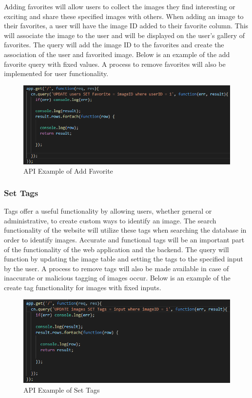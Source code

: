 \documentclass[12pt]{report}
\begin{document}
\begin{enumerate}
Adding favorites will allow users to collect the images they find interesting or exciting and share these specified images with others.  When adding an image to their favorites, a user will have the image ID added to their favorite column.  This will associate the image to the user and will be displayed on the user’s gallery of favorites.  The query will add the image ID to the favorites and create the association of the user and favorited image.  Below is an example of the add favorite query with fixed values.  A process to remove favorites will also be implemented for user functionality.

\begin{figure}[h]
	\centering
	\includegraphics[scale=0.5]{api_add_favorite}
	\caption{API Example of Add Favorite}
	\label{fig:API Add Favorite}
\end{figure}

\subsubsection*{Set Tags}

Tags offer a useful functionality by allowing users, whether general or administrative, to create custom ways to identify an image.  The search functionality of the website will utilize these tags when searching the database in order to identify images.  Accurate and functional tags will be an important part of the functionality of the web application and the backend.  The query will function by updating the image table and setting the tags to the specified input by the user.  A process to remove tags will also be made available in case of inaccurate or malicious tagging of images occur.  Below is an example of the create tag functionality for images with fixed inputs.

\begin{figure}[h]
	\centering
	\includegraphics[scale=0.5]{api_create_tags}
	\caption{API Example of Set Tags}
	\label{fig:API Set Tags}
\end{figure}


\end{enumerate}
\end{document}
